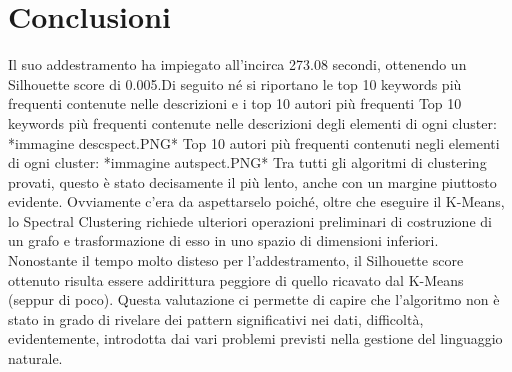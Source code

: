 \documentclass[12pt,oneside]{article}
\begin{document}
\section{Conclusioni}
    \begin{justify}
        Il suo addestramento ha impiegato all’incirca 273.08 secondi, ottenendo un Silhouette score di 0.005.Di seguito né si riportano le top 10 keywords più frequenti contenute nelle descrizioni e i top 10 autori più frequenti
        Top 10 keywords più frequenti contenute nelle descrizioni degli elementi di ogni cluster:
        *immagine descspect.PNG*
        Top 10 autori più frequenti contenuti negli elementi di ogni cluster:
        *immagine autspect.PNG*
        Tra tutti gli algoritmi di clustering provati, questo è stato decisamente il più lento, anche con un margine piuttosto evidente. Ovviamente c’era da aspettarselo poiché, oltre che eseguire il K-Means, lo Spectral Clustering richiede ulteriori operazioni preliminari di costruzione di un grafo e trasformazione di esso in uno spazio di dimensioni inferiori. Nonostante il tempo molto disteso per l’addestramento, il Silhouette score ottenuto risulta essere addirittura peggiore di quello ricavato dal K-Means (seppur di poco). Questa valutazione ci permette di capire che l’algoritmo non è stato in grado di rivelare dei pattern significativi nei dati, difficoltà, evidentemente, introdotta dai vari problemi previsti nella gestione del linguaggio naturale.
    \end{justify}
    
\end{document}
